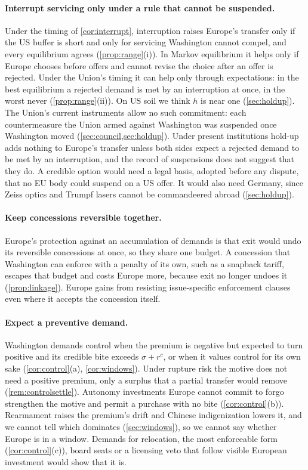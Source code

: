 \paragraph{Interrupt servicing only under a rule that cannot be suspended.} Under the timing of \cref{cor:interrupt}, interruption raises Europe's transfer only if the US buffer is short and only for servicing Washington cannot compel, and every equilibrium agrees (\cref{prop:range}(i)). In Markov equilibrium it helps only if Europe chooses before offers and cannot revise the choice after an offer is rejected. Under the Union's timing it can help only through expectations: in the best equilibrium a rejected demand is met by an interruption at once, in the worst never (\cref{prop:range}(ii)). On US soil we think $h$ is near one (\cref{sec:holdup}). The Union's current instruments allow no such commitment: each countermeasure the Union armed against Washington was suspended once Washington moved (\cref{sec:council,sec:holdup}). Under present institutions hold-up adds nothing to Europe's transfer unless both sides expect a rejected demand to be met by an interruption, and the record of suspensions does not suggest that they do. A credible option would need a legal basis, adopted before any dispute, that no EU body could suspend on a US offer. It would also need Germany, since Zeiss optics and Trumpf lasers cannot be commandeered abroad (\cref{sec:holdup}).

\paragraph{Keep concessions reversible together.} Europe's protection against an accumulation of demands is that exit would undo its reversible concessions at once, so they share one budget. A concession that Washington can enforce with a penalty of its own, such as a snapback tariff, escapes that budget and costs Europe more, because exit no longer undoes it (\cref{prop:linkage}). Europe gains from resisting issue-specific enforcement clauses even where it accepts the concession itself.

\paragraph{Expect a preventive demand.} Washington demands control when the premium is negative but expected to turn positive and its credible bite exceeds $\sigma+r^c$, or when it values control for its own sake (\cref{cor:control}(a), \cref{cor:windows}). Under rupture risk the motive does not need a positive premium, only a surplus that a partial transfer would remove (\cref{rem:controlsettle}). Autonomy investments Europe cannot commit to forgo strengthen the motive and permit a purchase with no bite (\cref{cor:control}(b)). Rearmament raises the premium's drift and Chinese indigenization lowers it, and we cannot tell which dominates (\cref{sec:windows}), so we cannot say whether Europe is in a window. Demands for relocation, the most enforceable form (\cref{cor:control}(c)), board seats or a licensing veto that follow visible European investment would show that it is.

